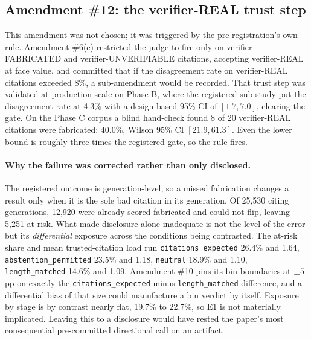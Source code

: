 \subsection{Amendment \#12: the verifier-REAL trust step}

This amendment was not chosen; it was triggered by the pre-registration's own
rule. Amendment \#6(c) restricted the judge to fire only on verifier-FABRICATED
and verifier-UNVERIFIABLE citations, accepting verifier-REAL at face value, and
committed that if the disagreement rate on verifier-REAL citations exceeded
8\%, a sub-amendment would be recorded. That trust step was validated at
production scale on Phase B, where the registered sub-study put the
disagreement rate at 4.3\% with a design-based 95\% CI of $[1.7, 7.0]$,
clearing the gate. On the Phase C corpus a blind hand-check found 8 of 20
verifier-REAL citations were fabricated: 40.0\%, Wilson 95\% CI
$[21.9, 61.3]$. Even the lower bound is roughly three times the registered
gate, so the rule fires.

\paragraph{Why the failure was corrected rather than only disclosed.}
The registered outcome is generation-level, so a missed fabrication changes a
result only when it is the sole bad citation in its generation. Of 25,530
citing generations, 12,920 were already scored fabricated and could not flip,
leaving 5,251 at risk. What made disclosure alone inadequate is not the level of
the error but its \emph{differential} exposure across the conditions being
contrasted. The at-risk share and mean trusted-citation load run
\texttt{citations\_expected} 26.4\% and 1.64, \texttt{abstention\_permitted}
23.5\% and 1.18, \texttt{neutral} 18.9\% and 1.10, \texttt{length\_matched}
14.6\% and 1.09. Amendment \#10 pins its bin boundaries at $\pm 5$pp on exactly
the \texttt{citations\_expected} minus \texttt{length\_matched} difference, and
a differential bias of that size could manufacture a bin verdict by itself.
Exposure by stage is by contrast nearly flat, 19.7\% to 22.7\%, so E1 is not
materially implicated. Leaving this to a disclosure would have rested the
paper's most consequential pre-committed directional call on an artifact.

